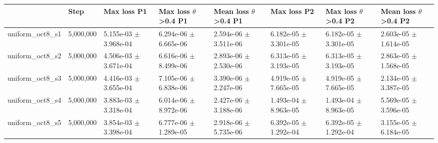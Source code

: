 \begin{tabular}{llllllll}
\toprule
 & Step & Max loss P1 & Max loss $\theta$>0.4 P1 & Mean loss $\theta$>0.4 P1 & Max loss P2 & Max loss $\theta$>0.4 P2 & Mean loss $\theta$>0.4 P2 \\
\midrule
uniform\_oct8\_s1 & 5,000,000 & 5.155e-03 $\pm$ 3.968e-04 & 6.294e-06 $\pm$ 6.665e-06 & 2.594e-06 $\pm$ 3.511e-06 & 6.182e-05 $\pm$ 3.301e-05 & 6.182e-05 $\pm$ 3.301e-05 & 2.603e-05 $\pm$ 1.614e-05 \\
uniform\_oct8\_s2 & 5,000,000 & 4.506e-03 $\pm$ 3.671e-04 & 6.616e-06 $\pm$ 8.499e-06 & 2.893e-06 $\pm$ 2.530e-06 & 6.313e-05 $\pm$ 3.193e-05 & 6.313e-05 $\pm$ 3.193e-05 & 2.863e-05 $\pm$ 1.568e-05 \\
uniform\_oct8\_s3 & 5,000,000 & 4.416e-03 $\pm$ 3.655e-04 & 7.105e-06 $\pm$ 6.838e-06 & 3.390e-06 $\pm$ 2.247e-06 & 4.919e-05 $\pm$ 7.665e-05 & 4.919e-05 $\pm$ 7.665e-05 & 2.134e-05 $\pm$ 3.387e-05 \\
uniform\_oct8\_s4 & 5,000,000 & 3.883e-03 $\pm$ 3.318e-04 & 6.014e-06 $\pm$ 8.972e-06 & 2.427e-06 $\pm$ 3.188e-06 & 1.493e-04 $\pm$ 8.963e-05 & 1.493e-04 $\pm$ 8.963e-05 & 5.569e-05 $\pm$ 3.596e-05 \\
uniform\_oct8\_s5 & 5,000,000 & 3.854e-03 $\pm$ 3.398e-04 & 6.777e-06 $\pm$ 1.289e-05 & 2.918e-06 $\pm$ 5.735e-06 & 6.392e-05 $\pm$ 1.292e-04 & 6.392e-05 $\pm$ 1.292e-04 & 3.155e-05 $\pm$ 6.184e-05 \\
\bottomrule
\end{tabular}
